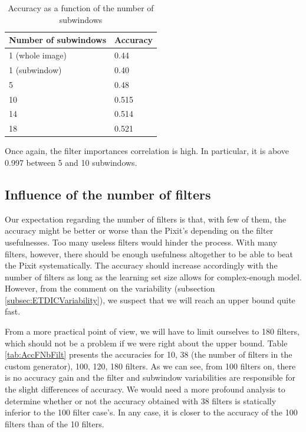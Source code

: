 \documentclass[a4paper]{report}
\begin{document}
		\begin{table}
			\centering
				\begin{tabular}{l|l}
				\hline
				Number of subwindows & Accuracy \\
				\hline \hline
				1 (whole image) & 0.44\\
				1 (subwindow) & 0.40 \\
				5 & 0.48 \\
				10 & 0.515 \\
				14 &  0.514\\
				18 &  0.521 \\
				\hline
				
				\end{tabular}
			\caption{\label{tab:AccFNbSW}Accuracy as a function of the number of subwindows}
		\end{table}
		
		
	\par
	Once again, the filter importances correlation is high. In particular, it is above 0.997 between 5 and 10 subwindows.
	
		
		
	\subsection{Influence of the number of filters}
	Our expectation regarding the number of filters is that, with few of them, the accuracy might be better or worse than the Pixit's depending on the filter usefulnesses. Too many useless filters would hinder the process. With many filters, however, there should be enough usefulness altogether to be able to beat the Pixit systematically. The accuracy should increase accordingly with the number of filters as long as the learning set size allows for complex-enough model. However, from the comment on the variability (subsection \ref{subsec:ETDICVariability}), we suspect that we will reach an upper bound quite fast. 
	\par
	From a more practical point of view, we will have to limit ourselves to 180 filters, which should not be a problem if we were right about the upper bound. Table \ref{tab:AccFNbFilt} presents the accuracies for 10, 38 (the number of filters in the custom generator), 100, 120, 180 filters. As we can see, from 100 filters on, there is no accuracy gain and the filter and subwindow variabilities are responsible for the slight differences of accuracy. We would need a more profound analysis to determine whether or not the accuracy obtained with 38 filters is statically inferior to the 100 filter case's. In any case, it is closer to the accuracy of the 100 filters than of the 10 filters.
	
\end{document}
